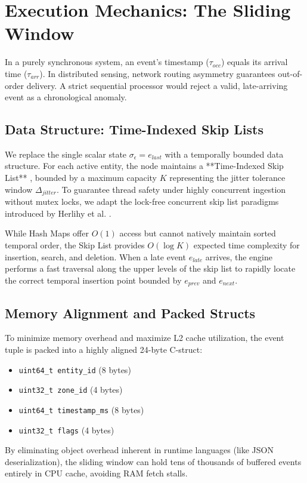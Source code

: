 \documentclass[conference]{IEEEtran}
\begin{document}
\section{Execution Mechanics: The Sliding Window}


In a purely synchronous system, an event's timestamp ($\tau_{occ}$) equals its arrival time ($\tau_{arr}$). In distributed sensing, network routing asymmetry guarantees out-of-order delivery. A strict sequential processor would reject a valid, late-arriving event as a chronological anomaly.

\subsection{Data Structure: Time-Indexed Skip Lists}
We replace the single scalar state $\sigma_\epsilon = e_{last}$ with a temporally bounded data structure. For each active entity, the node maintains a **Time-Indexed Skip List** \cite{b8}, bounded by a maximum capacity $K$ representing the jitter tolerance window $\Delta_{jitter}$. To guarantee thread safety under highly concurrent ingestion without mutex locks, we adapt the lock-free concurrent skip list paradigms introduced by Herlihy et al. \cite{b22}.

While Hash Maps offer $O(1)$ access but cannot natively maintain sorted temporal order, the Skip List provides $O(\log K)$ expected time complexity for insertion, search, and deletion. When a late event $e_{late}$ arrives, the engine performs a fast traversal along the upper levels of the skip list to rapidly locate the correct temporal insertion point bounded by $e_{prev}$ and $e_{next}$. 

\subsection{Memory Alignment and Packed Structs}
To minimize memory overhead and maximize L2 cache utilization, the event tuple is packed into a highly aligned 24-byte C-struct:
\begin{itemize}
    \item \texttt{uint64\_t entity\_id} (8 bytes)
    \item \texttt{uint32\_t zone\_id} (4 bytes)
    \item \texttt{uint64\_t timestamp\_ms} (8 bytes)
    \item \texttt{uint32\_t flags} (4 bytes)
\end{itemize}
By eliminating object overhead inherent in runtime languages (like JSON deserialization), the sliding window can hold tens of thousands of buffered events entirely in CPU cache, avoiding RAM fetch stalls.
\end{document}
